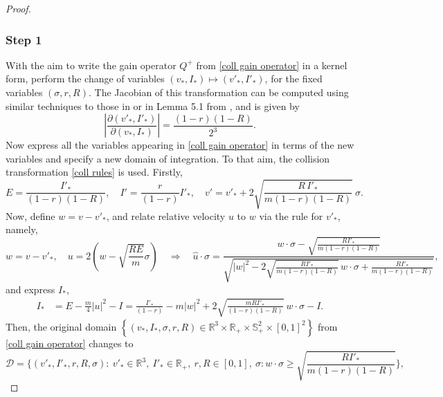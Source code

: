 \documentclass[11pt,a4paper]{amsart}
\newcommand{\bRp}{\mathbb{R}_+}
\newcommand{\bRfp}{\mathbb{R}^3 \times \bRp}
\newcommand{\bSp}{\mathbb{S}^2_+}
\newcommand{\D}{\mathcal{D}}
\newcommand{\B}{B}
\newcommand{\param}{ \sigma, r, R}
\newcommand{\domparam}{\bSp \times [0,1]^2}
\begin{document}
\begin{proof}
\subsubsection*{Step 1}	With the aim   to write the gain operator  $Q^+$  from \eqref{coll gain operator} in a kernel form,  perform the change of variables $(v_*,I_*) \mapsto (v'_*,I'_*)$, for the fixed variables $(\param)$. The Jacobian of this transformation can be computed using  similar techniques to those in \cite{Brull-Comp-2} or in Lemma 5.1 from \cite{MC-Alonso-Lp}, and is given by
\begin{equation*}
\left| \frac{\partial (v'_*,I'_*)}{\partial (v_*, I_*)} \right| = \frac{(1-r)(1-R)}{2^3}.
\end{equation*}
Now express all  the variables appearing in \eqref{coll gain operator} in terms of the new variables and   specify a new domain of integration. To that aim,  the collision transformation \eqref{coll rules} is used. Firstly,
\begin{equation*}
	E= \frac{I'_*}{(1-r)(1-R)}, \quad I'=\frac{r}{(1-r)}I'_*, \quad v' = v'_* + 2 \sqrt{\frac{R \, I'_*}{m(1-r)(1-R)}} \ \sigma.
\end{equation*}
Now,   define $w=v-v'_*$, and relate relative velocity $u$ to $w$ via the rule for $v'_*$, namely, 
\begin{equation}\label{u->w}
w=v-v'_*, \quad u=2\left(w -\sqrt{\frac{RE}{m}} \sigma\right) \quad \Rightarrow \quad \hat{u}\cdot\sigma = \frac{w\cdot\sigma-\sqrt{\frac{R I'_*}{m(1-r)(1-R)}}}{\sqrt{|w|^2-2 \sqrt{\frac{R  I'_*}{m(1-r)(1-R)}} \, w \cdot\sigma + \frac{R  I'_*}{m(1-r)(1-R)} } },
\end{equation}
and express $I_*$,
\begin{equation}\label{Is as I}
	\begin{split}
		I_* &= E - \frac{m}{4}|u|^2 -I
	=  \frac{I'_*}{(1-r)} - m |w|^2+2 \sqrt{\frac{m R  I'_*}{(1-r)(1-R)}} \ w \cdot\sigma   -I.
	\end{split}
\end{equation}
Then, the original domain $\left\{   (v_*,I_*,\param)\in \bRfp \times \domparam \right\}$ from \eqref{coll gain operator} changes to
\begin{equation}\label{domain prime}
	\D = \Bigg\{  (v'_*,I'_*,r, {R}, \sigma): \ v'_* \in \mathbb{R}^3,\ I'_*\in\mathbb{R}_+, \ r,  {R} \in[0,1],
 \ \sigma:  w\cdot\sigma \geq \sqrt{\frac{R I'_*}{m(1-r)(1-R)}} \Bigg\},

\end{equation}
\end{proof}
\end{document}
